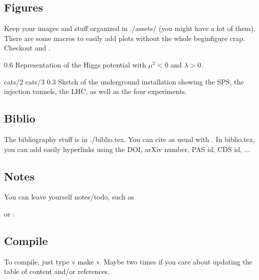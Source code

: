     \subsection{Figures}

    Keep your images and stuff organized in ./assets/ (you might have a lot of
    them). There are some macros to easily add plots without the whole
    begin{figure} crap. Checkout  and
    .

                 {0.6}       %
                 {Representation of the Higgs potential with $\mu^2 < 0$ and
                 $\lambda > 0$.} %

                     {cats/2}       %
                     {cats/3}       %
                     {0.3}         %
                     {Sketch of the underground installation showing the SPS,
                     the injection tunnels, the LHC, as well as the four
                     experiments.}


    \subsection{Biblio}

    The bibliography stuff is in ./biblio.tex. You can cite as usual with
    \cite{topPtReweighting}. In biblio.tex, you can add easily hyperlinks using
    the DOI, arXiv number, PAS id, CDS id, ...

    \subsection{Notes}

    You can leave yourself notes/todo, such as 

    or :


    \subsection{Compile}

    To compile, just type « make ». Maybe two times if you care about updating
    the table of content and/or references.

